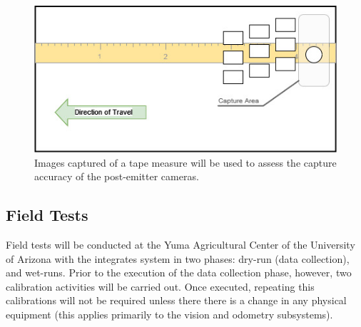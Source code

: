 \documentclass[12pt]{article}
\begin{document}
\begin{figure}[H]
	\centering
	\includegraphics[width=0.75\linewidth]{./figures/test-of-distance-post-emitter.jpg}
	\caption[Test of capture for post-emitter cameras]{Images captured of a tape measure will be used to assess the capture accuracy of the post-emitter cameras.}
	\label{fig:post-emitter}
\end{figure}

\subsection{Field Tests}
Field tests will be conducted at the Yuma Agricultural Center of the University of Arizona with the integrates system in two phases: dry-run (data collection), and wet-runs. Prior to the execution of the data collection phase, however, two calibration activities will be carried out. Once executed, repeating this calibrations will not be required unless there there is a change in any physical equipment (this applies primarily to the vision and odometry subsystems).
\end{document}
